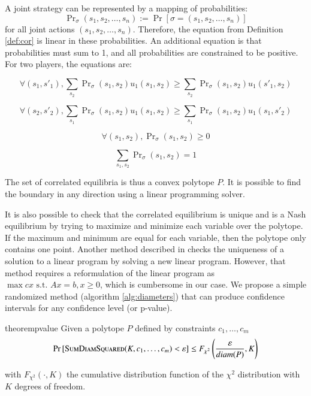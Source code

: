 \documentclass[preprint,12pt,authoryear]{elsarticle}
\theoremstyle{definition}
\begin{document}
A joint strategy can be represented by a mapping of probabilities: $$\Pr\nolimits_\sigma(s_1, s_2, \ldots, s_n) := \Pr[\sigma = (s_1, s_2, \ldots, s_n)]$$ for all joint actions $(s_1, s_2, \ldots, s_n)$. Therefore, the equation from Definition \ref{def:cor} is linear in these probabilities. An additional equation is that probabilities must sum to 1, and all probabilities are constrained to be positive. For two players, the equations are:

$$\forall (s_1, s'_1), \sum_{s_2} \Pr\nolimits_\sigma(s_1, s_2) u_1(s_1, s_2) \ge \sum_{s_2} \Pr\nolimits_\sigma(s_1, s_2) u_1(s'_1, s_2)$$

$$\forall (s_2, s'_2), \sum_{s_1} \Pr\nolimits_\sigma(s_1, s_2) u_1(s_1, s_2) \ge \sum_{s_1} \Pr\nolimits_\sigma(s_1, s_2) u_1(s_1, s'_2)$$

$$\forall (s_1, s_2), \Pr\nolimits_\sigma(s_1, s_2) \ge 0$$

$$\sum_{s_1,s_2} \Pr\nolimits_\sigma(s_1, s_2) = 1$$


The set of correlated equilibria is thus a convex polytope $P$. It is possible to find the boundary in any direction using a linear programming solver.

It is also possible to check that the correlated equilibrium is unique and is a Nash equilibrium by trying to maximize and minimize each variable over the polytope. If the maximum and minimum are equal for each variable, then the polytope only contains one point. Another method described in \citet{appa2002uniqueness} checks the uniqueness of a solution to a linear program by solving a new linear program. However, that method requires a reformulation of the linear program as $\max cx \text{ s.t. } Ax=b, x \ge 0$, which is cumbersome in our case. We propose a simple randomized method (algorithm \ref{alg:diameters}) that can produce confidence intervals for any confidence level (or p-value).

\begin{restatable}{theorem}{pvalue}
\label{thm:pvalue}
Given a polytope $P$ defined by constraints $c_1, \ldots, c_m$
 $$
        \Pr\left[\textsc{SumDiamSquared}(K, c_1, \ldots, c_m) < \varepsilon\right] \le F_{\chi^2}\left(\frac{\varepsilon}{diam(P)}, K\right)
   $$

   with $F_{\chi^2}(\cdot, K)$ the cumulative distribution function of the $\chi^2$ distribution with $K$ degrees of freedom.
\end{restatable}
\end{document}
